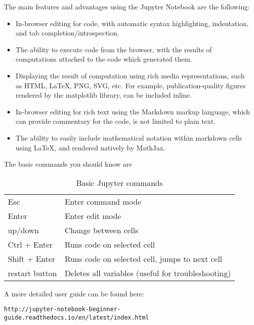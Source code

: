 \noindent The main features and advantages using the Jupyter Notebook are the
following:

\begin{itemize}

\item In-browser editing for code, with automatic syntax highlighting, indentation, and tab completion/introspection.

\item The ability to execute code from the browser, with the results of computations attached to the code which generated them.

\item Displaying the result of computation using rich media representations, such as HTML, LaTeX, PNG, SVG, etc. For example, publication-quality figures rendered by the matplotlib library, can be included inline.

\item In-browser editing for rich text using the Markdown markup language, which can provide commentary for the code, is not limited to plain text.

\item The ability to easily include mathematical notation within markdown cells using LaTeX, and rendered natively by MathJax.

\end{itemize}

\noindent The basic commands you should know are
\clearpage

\begin{table}[!h]
\begin{center}
\begin{tabular}{|l|l|}
\hline
Esc              & Enter command mode\\
Enter            & Enter edit mode\\
\hline
up/down          & Change between cells\\
Ctrl + Enter     & Runs code on selected cell\\
Shift + Enter    & Runs code on selected cell, jumps to next cell\\
\hline
restart button   & Deletes all variables (useful for troubleshooting)\\ 
\hline
\end{tabular}
\end{center}
\caption{\label{tb::jupyterbasiccommands}Basic Jupyter commands}
\end{table}

\noindent A more detailed user guide can be found here:

\begin{verbatim}
http://jupyter-notebook-beginner-guide.readthedocs.io/en/latest/index.html
\end{verbatim}

